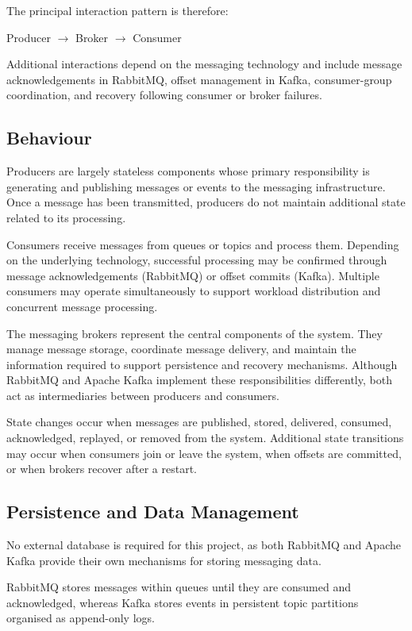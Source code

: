 \documentclass{scrartcl}
\begin{document}
The principal interaction pattern is therefore:

\begin{center}
Producer $\rightarrow$ Broker $\rightarrow$ Consumer
\end{center}

Additional interactions depend on the messaging technology and include message acknowledgements in RabbitMQ, offset management in Kafka, consumer-group coordination, and recovery following consumer or broker failures.


\subsection{Behaviour}

Producers are largely stateless components whose primary responsibility is generating and publishing messages or events to the messaging infrastructure. Once a message has been transmitted, producers do not maintain additional state related to its processing.

Consumers receive messages from queues or topics and process them. Depending on the underlying technology, successful processing may be confirmed through message acknowledgements (RabbitMQ) or offset commits (Kafka). Multiple consumers may operate simultaneously to support workload distribution and concurrent message processing.

The messaging brokers represent the central components of the system. They manage message storage, coordinate message delivery, and maintain the information required to support persistence and recovery mechanisms. Although RabbitMQ and Apache Kafka implement these responsibilities differently, both act as intermediaries between producers and consumers.

State changes occur when messages are published, stored, delivered, consumed, acknowledged, replayed, or removed from the system. Additional state transitions may occur when consumers join or leave the system, when offsets are committed, or when brokers recover after a restart.


\subsection{Persistence and Data Management}

No external database is required for this project, as both RabbitMQ and Apache Kafka provide their own mechanisms for storing messaging data.

RabbitMQ stores messages within queues until they are consumed and acknowledged, whereas Kafka stores events in persistent topic partitions organised as append-only logs.
\end{document}
